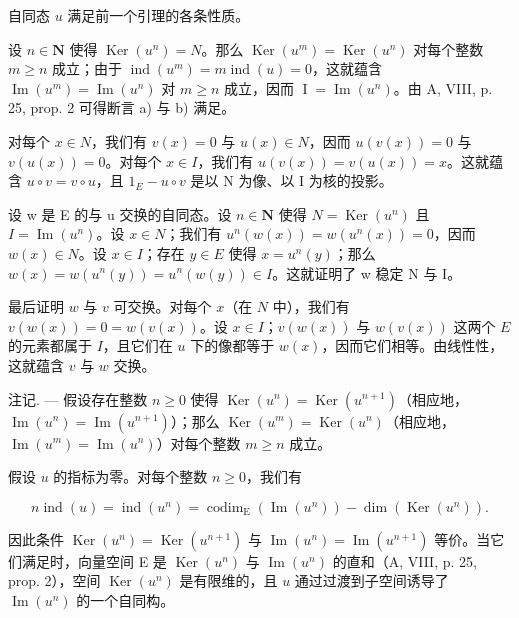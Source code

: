 自同态 \(u\) 满足前一个引理的各条性质。

设 \(n \in \mathbf{N}\) 使得 \(\operatorname{Ker}(u^{n}) = N\)。那么 \(\operatorname{Ker}(u^{m}) = \operatorname{Ker}(u^{n})\) 对每个整数 \(m \geqslant n\) 成立；由于 \(\operatorname{ind}(u^{m}) = m \operatorname{ind}(u) = 0\)，这就蕴含 \(\operatorname{Im}(u^{m}) = \operatorname{Im}(u^{n})\) 对 \(m \geqslant n\) 成立，因而 \(\operatorname{I} = \operatorname{Im}(u^{n})\)。由 A, VIII, p. 25, prop. 2 可得断言 a) 与 b) 满足。

对每个 \(x \in N\)，我们有 \(v(x) = 0\) 与 \(u(x) \in N\)，因而 \(u(v(x)) = 0\) 与 \(v(u(x)) = 0\)。对每个 \(x \in I\)，我们有 \(u(v(x)) = v(u(x)) = x\)。这就蕴含 \(u \circ v = v \circ u\)，且 \(1_{E} - u \circ v\) 是以 N 为像、以 I 为核的投影。

设 w 是 E 的与 u 交换的自同态。设 \(n \in \mathbf{N}\) 使得 \(N = \operatorname{Ker}(u^{n})\) 且 \(I = \operatorname{Im}(u^{n})\)。设 \(x \in N\)；我们有 \(u^{n}(w(x)) = w(u^{n}(x)) = 0\)，因而 \(w(x) \in N\)。设 \(x \in I\)；存在 \(y \in E\) 使得 \(x = u^{n}(y)\)；那么 \(w(x) = w(u^{n}(y)) = u^{n}(w(y)) \in I\)。这就证明了 w 稳定 N 与 I。

最后证明 \(w\) 与 \(v\) 可交换。对每个 \(x\)（在 \(N\) 中），我们有 \(v(w(x)) = 0 = w(v(x))\)。设 \(x \in I\)；\(v(w(x))\) 与 \(w(v(x))\) 这两个 \(E\) 的元素都属于 \(I\)，且它们在 \(u\) 下的像都等于 \(w(x)\)，因而它们相等。由线性性，这就蕴含 \(v\) 与 \(w\) 交换。

注记. --- 假设存在整数 \(n \geqslant 0\) 使得 \(\operatorname{Ker}(u^{n}) = \operatorname{Ker}(u^{n+1})\)（相应地，\(\operatorname{Im}(u^{n}) = \operatorname{Im}(u^{n+1})\)）；那么 \(\operatorname{Ker}(u^{m}) = \operatorname{Ker}(u^{n})\)（相应地，\(\operatorname{Im}(u^{m}) = \operatorname{Im}(u^{n})\)）对每个整数 \(m \geqslant n\) 成立。

假设 \(u\) 的指标为零。对每个整数 \(n \geqslant 0\)，我们有

\[
n \operatorname{ind} (u) = \operatorname{ind} \left(u ^ {n}\right) = \operatorname{codim} _ {\mathrm{E}} \left(\operatorname{Im} \left(u ^ {n}\right)\right) - \dim \left(\operatorname{Ker} \left(u ^ {n}\right)\right).
\]

因此条件 \(\operatorname{Ker}(u^n) = \operatorname{Ker}(u^{n+1})\) 与 \(\operatorname{Im}(u^n) = \operatorname{Im}(u^{n+1})\) 等价。当它们满足时，向量空间 E 是 \(\operatorname{Ker}(u^n)\) 与 \(\operatorname{Im}(u^n)\) 的直和（A, VIII, p. 25, prop. 2），空间 \(\operatorname{Ker}(u^n)\) 是有限维的，且 \(u\) 通过过渡到子空间诱导了 \(\operatorname{Im}(u^n)\) 的一个自同构。

